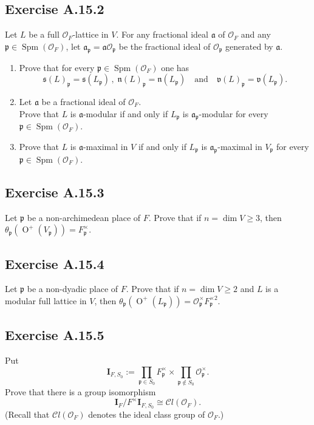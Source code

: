 \documentclass[12pt, a4paper]{article}
\begin{document}
\subsection*{Exercise A.15.2}
Let $L$ be a full $\mathcal{O}_F$-lattice in $V$. For any fractional ideal $\mathfrak{a}$ of $\mathcal{O}_F$ and any $\mathfrak{p} \in \operatorname{Spm}(\mathcal{O}_F)$, let $\mathfrak{a}_{\mathfrak{p}} = \mathfrak{a}\mathcal{O}_{\mathfrak{p}}$ be the fractional ideal of $\mathcal{O}_{\mathfrak{p}}$ generated by $\mathfrak{a}$.
\begin{enumerate}
    \item Prove that for every $\mathfrak{p} \in \operatorname{Spm}(\mathcal{O}_F)$ one has
    \[ \mathfrak{s}(L)_{\mathfrak{p}} = \mathfrak{s}(L_{\mathfrak{p}}) \,,\; \mathfrak{n}(L)_{\mathfrak{p}} = \mathfrak{n}(L_{\mathfrak{p}}) \quad \text{and} \quad \mathfrak{v}(L)_{\mathfrak{p}} = \mathfrak{v}(L_{\mathfrak{p}}) . \]
    \item Let $\mathfrak{a}$ be a fractional ideal of $\mathcal{O}_F$. \\
    Prove that $L$ is $\mathfrak{a}$-modular if and only if $L_{\mathfrak{p}}$ is $\mathfrak{a}_{\mathfrak{p}}$-modular for every $\mathfrak{p} \in \operatorname{Spm}(\mathcal{O}_F)$.
    \item Prove that $L$ is $\mathfrak{a}$-maximal in $V$ if and only if $L_{\mathfrak{p}}$ is $\mathfrak{a}_{\mathfrak{p}}$-maximal in $V_{\mathfrak{p}}$ for every $\mathfrak{p} \in \operatorname{Spm}(\mathcal{O}_F)$.
\end{enumerate}

\subsection*{Exercise A.15.3}
Let $\mathfrak{p}$ be a non-archimedean place of $F$. Prove that if $n = \dim V \ge 3$, then $\theta_{\mathfrak{p}}(\operatorname{O}^+(V_{\mathfrak{p}})) = F_{\mathfrak{p}}^\times$.

\subsection*{Exercise A.15.4}
Let $\mathfrak{p}$ be a non-dyadic place of $F$. Prove that if $n = \dim V \ge 2$ and $L$ is a modular full lattice in $V$, then $\theta_{\mathfrak{p}}(\operatorname{O}^+(L_{\mathfrak{p}})) = \mathcal{O}_{\mathfrak{p}}^\times F_{\mathfrak{p}}^{\times 2}$.

\subsection*{Exercise A.15.5}
Put
\[ \mathbf{I}_{F, S_0} := \prod_{\mathfrak{p} \in S_0} F_{\mathfrak{p}}^\times \times \prod_{\mathfrak{p} \notin S_0} \mathcal{O}_{\mathfrak{p}}^\times . \]
Prove that there is a group isomorphism
\[ \mathbf{I}_F / F^\times \mathbf{I}_{F, S_0} \cong \mathcal{C}l(\mathcal{O}_F) . \]
(Recall that $\mathcal{C}l(\mathcal{O}_F)$ denotes the ideal class group of $\mathcal{O}_F$.)
\end{document}
